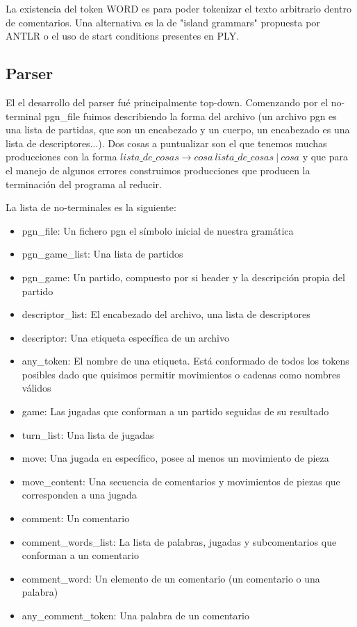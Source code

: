 La existencia del token WORD es para poder tokenizar el texto arbitrario dentro de comentarios. Una alternativa es la de "island grammars" propuesta por ANTLR o el uso de start conditions presentes en PLY.

\subsection{Parser}

El el desarrollo del parser fué principalmente top-down. Comenzando por el no-terminal pgn\_file fuimos describiendo la forma del archivo (un archivo pgn es una lista de partidas, que son un encabezado y un cuerpo, un encabezado es una lista de descriptores...). Dos cosas a puntualizar son el que tenemos muchas producciones con la forma $lista\_de\_cosas \rightarrow cosa\ lista\_de\_cosas\ |\ cosa$ y que para el manejo de algunos errores construimos producciones que producen la terminación del programa al reducir.

La lista de no-terminales es la siguiente:

  \begin{itemize}
    \item pgn\_file: Un fichero pgn el símbolo inicial de nuestra gramática
    \item pgn\_game\_list: Una lista de partidos
    \item pgn\_game: Un partido, compuesto por si header y la descripción propia del partido
    \item descriptor\_list: El encabezado del archivo, una lista de descriptores
    \item descriptor: Una etiqueta específica de un archivo
    \item any\_token: El nombre de una etiqueta. Está conformado de todos los tokens posibles dado que quisimos permitir movimientos o cadenas como nombres válidos
    \item game: Las jugadas que conforman a un partido seguidas de su resultado
    \item turn\_list: Una lista de jugadas
    \item move: Una jugada en específico, posee al menos un movimiento de pieza
    \item move\_content: Una secuencia de comentarios y movimientos de piezas que corresponden a una jugada
    \item comment: Un comentario
    \item comment\_words\_list: La lista de palabras, jugadas y subcomentarios que conforman a un comentario
    \item comment\_word: Un elemento de un comentario (un comentario o una palabra)
    \item any\_comment\_token: Una palabra de un comentario
\end{itemize}  

